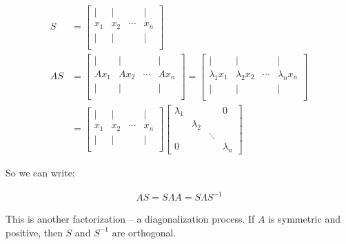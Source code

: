 \begin{align*}
  S &=
  \begin{bmatrix}
    | & | &  & | \\
    x_1 & x_2 & \cdots & x_n \\
    | & | &  & | \\
  \end{bmatrix} \\
  AS &=
  \begin{bmatrix}
    | & | &  & | \\
    Ax_1 & Ax_2 & \cdots & Ax_n \\
    | & | &  & | \\
  \end{bmatrix} = 
  \begin{bmatrix}
    | & | &  & | \\
    \lambda_1x_1 & \lambda_2x_2 & \cdots & \lambda_nx_n \\
    | & | &  & | \\
  \end{bmatrix} \\
  &= \begin{bmatrix}
    | & | &  & | \\
    x_1 & x_2 & \cdots & x_n \\
    | & | &  & | \\
  \end{bmatrix}
  \begin{bmatrix}
    \lambda_1 & & & 0 \\
    & \lambda_2 &\\
    & & \ddots\\
    0& & & \lambda_n
  \end{bmatrix}
\end{align*}

So we can write:

\begin{align*}
  AS = S \Lambda
  A = S \Lambda S^{-1}
\end{align*}

This is another factorization -- a diagonalization process. If $A$ is symmetric and positive, then $S$ and $S^{-1}$ are orthogonal.           


